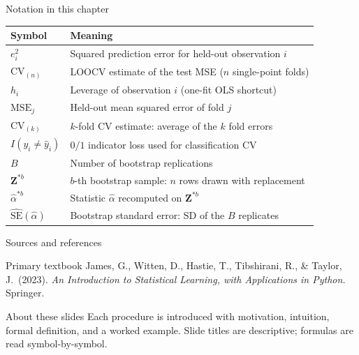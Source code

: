 \documentclass[aspectratio=169,11pt]{beamer}
\begin{document}
\begin{frame}{Notation in this chapter}
  \footnotesize
  \begin{center}
  \begin{tabular}{@{}ll@{}}
    \toprule
    \textbf{Symbol} & \textbf{Meaning} \\
    \midrule
    $e_i^2$ & Squared prediction error for held-out observation $i$ \\
    $\mathrm{CV}_{(n)}$ & LOOCV estimate of the test MSE ($n$ single-point folds) \\
    $h_i$ & Leverage of observation $i$ (one-fit OLS shortcut) \\
    $\mathrm{MSE}_j$ & Held-out mean squared error of fold $j$ \\
    $\mathrm{CV}_{(k)}$ & $k$-fold CV estimate: average of the $k$ fold errors \\
    $I(y_i \ne \hat y_i)$ & $0/1$ indicator loss used for classification CV \\
    $B$ & Number of bootstrap replications \\
    $\mathbf{Z}^{*b}$ & $b$-th bootstrap sample: $n$ rows drawn with replacement \\
    $\hat\alpha^{*b}$ & Statistic $\hat\alpha$ recomputed on $\mathbf{Z}^{*b}$ \\
    $\widehat{\mathrm{SE}}(\hat\alpha)$ & Bootstrap standard error: SD of the $B$ replicates \\
    \bottomrule
  \end{tabular}
  \end{center}
\end{frame}

\begin{frame}{Sources and references}
  \begin{block}{Primary textbook}
    James, G., Witten, D., Hastie, T., Tibshirani, R., \& Taylor, J.\ (2023).
    \emph{An Introduction to Statistical Learning, with Applications in
    Python.} Springer.
  \end{block}
  \begin{block}{About these slides}
    Each procedure is introduced with motivation, intuition, formal
    definition, and a worked example. Slide titles are descriptive;
    formulas are read symbol-by-symbol.
  \end{block}
\end{frame}
\end{document}

